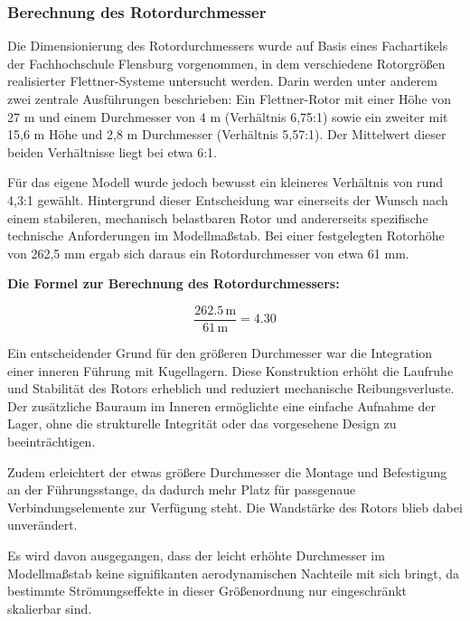 \documentclass[a4paper,12pt]{article}
\begin{document}
\newpage

\subsubsection{Berechnung des Rotordurchmesser}
Die Dimensionierung des Rotordurchmessers wurde auf Basis eines Fachartikels der Fachhochschule Flensburg vorgenommen, in dem verschiedene Rotorgrößen realisierter Flettner-Systeme untersucht werden. Darin werden unter anderem zwei zentrale Ausführungen beschrieben: Ein Flettner-Rotor mit einer Höhe von 27 m und einem Durchmesser von 4 m (Verhältnis 6,75:1) sowie ein zweiter mit 15,6 m Höhe und 2,8 m Durchmesser (Verhältnis 5,57:1). Der Mittelwert dieser beiden Verhältnisse liegt bei etwa 6:1.\cite{Fachhochschule_Flensburg}\newline

Für das eigene Modell wurde jedoch bewusst ein kleineres Verhältnis von rund 4,3:1 gewählt. Hintergrund dieser Entscheidung war einerseits der Wunsch nach einem stabileren, mechanisch belastbaren Rotor und andererseits spezifische technische Anforderungen im Modellmaßstab. Bei einer festgelegten Rotorhöhe von 262,5 mm ergab sich daraus ein Rotordurchmesser von etwa 61 mm.\newline


\textbf{Die Formel zur Berechnung des Rotordurchmessers:}

\[
\frac{262.5 \, \text{m}}{61 \, \text{m}} = 4.30
\]\newline

Ein entscheidender Grund für den größeren Durchmesser war die Integration einer inneren Führung mit Kugellagern. Diese Konstruktion erhöht die Laufruhe und Stabilität des Rotors erheblich und reduziert mechanische Reibungsverluste. Der zusätzliche Bauraum im Inneren ermöglichte eine einfache Aufnahme der Lager, ohne die strukturelle Integrität oder das vorgesehene Design zu beeinträchtigen.

Zudem erleichtert der etwas größere Durchmesser die Montage und Befestigung an der Führungsstange, da dadurch mehr Platz für passgenaue Verbindungselemente zur Verfügung steht. Die Wandstärke des Rotors blieb dabei unverändert.\newline

Es wird davon ausgegangen, dass der leicht erhöhte Durchmesser im Modellmaßstab keine signifikanten aerodynamischen Nachteile mit sich bringt, da bestimmte Strömungseffekte in dieser Größenordnung nur eingeschränkt skalierbar sind.
\end{document}

